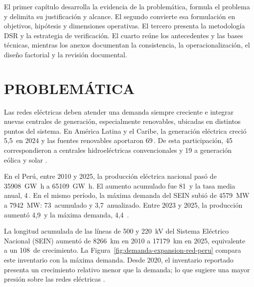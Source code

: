 \documentclass[11pt,a4paper,oneside]{report}
\newcommand{\pct}{\mbox{\char37}}
\begin{document}
El primer capítulo desarrolla la evidencia de la problemática, formula el problema y delimita su justificación y alcance. El segundo convierte esa formulación en objetivos, hipótesis y dimensiones operativas. El tercero presenta la metodología DSR y la estrategia de verificación. El cuarto reúne los antecedentes y las bases técnicas, mientras los anexos documentan la consistencia, la operacionalización, el diseño factorial y la revisión documental.

\section{PROBLEMÁTICA}

Las redes eléctricas deben atender una demanda siempre creciente e integrar nuevas centrales de generación, especialmente renovables, ubicadas en distintos puntos del sistema. En América Latina y el Caribe, la generación eléctrica creció 5,5\,\pct{} en 2024 y las fuentes renovables aportaron 69\,\pct{}. De esta participación, 45\,\pct{} correspondieron a centrales hidroeléctricas convencionales y 19 a generación eólica y solar \parencite{olade2025generacionALC2024}.

En el Perú, entre 2010 y 2025, la producción eléctrica nacional pasó de \SI{35908}{\giga\watt\hour} a \SI{65109}{\giga\watt\hour}. El aumento acumulado fue 81\,\pct{} y la tasa media anual, 4\,\pct{}. En el mismo período, la máxima demanda del SEIN subió de \SI{4579}{\mega\watt} a \SI{7942}{\mega\watt}: 73\,\pct{} acumulado y 3,7\,\pct{} anualizado. Entre 2023 y 2025, la producción aumentó 4,9\,\pct{} y la máxima demanda, 4,4\,\pct{} \parencites[sec.~10.4]{minem2025anuario2024}[cuadro~4]{minem2025indicadoresDiciembre}{coesMaximaDemanda}.

La longitud acumulada de las líneas de 500 y \SI{220}{\kilo\volt} del Sistema Eléctrico Nacional (SEIN) aumentó de \SI{8266}{\kilo\metre} en 2010 a \SI{17179}{\kilo\metre} en 2025, equivalente a un 108\,\pct{} de crecimiento. La Figura~\ref{fig:demanda-expansion-red-peru} compara este inventario con la máxima demanda. Desde 2020, el inventario reportado presenta un crecimiento relativo menor que la demanda; lo que sugiere una mayor presión sobre las redes eléctricas \parencites{coesEstadisticasAnuales}{coesMaximaDemanda}.
\end{document}
